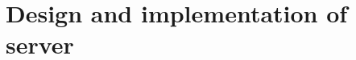 \documentclass[Main]{subfiles}
\begin{document}
\section{Design and implementation of server}








\end{document}
